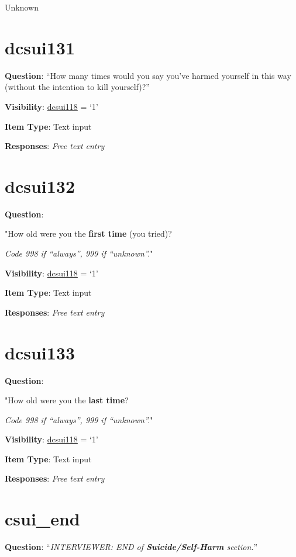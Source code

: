 \documentclass[]{book}
\begin{document}
Unknown

\hypertarget{dcsui131}{%
\section{dcsui131}\label{dcsui131}}

\textbf{Question}: ``How many times would you say you've harmed yourself in this way (without the intention to kill yourself)?''

\textbf{Visibility}: \protect\hyperlink{dcsui118}{dcsui118} = `1'

\textbf{Item Type}: Text input

\textbf{Responses}: \emph{Free text entry}

\hypertarget{dcsui132}{%
\section{dcsui132}\label{dcsui132}}

\textbf{Question}:

"How old were you the \textbf{first time} (you tried)?

\emph{Code 998 if ``always'', 999 if ``unknown''.}"

\textbf{Visibility}: \protect\hyperlink{dcsui118}{dcsui118} = `1'

\textbf{Item Type}: Text input

\textbf{Responses}: \emph{Free text entry}

\hypertarget{dcsui133}{%
\section{dcsui133}\label{dcsui133}}

\textbf{Question}:

"How old were you the \textbf{last time}?

\emph{Code 998 if ``always'', 999 if ``unknown''.}"

\textbf{Visibility}: \protect\hyperlink{dcsui118}{dcsui118} = `1'

\textbf{Item Type}: Text input

\textbf{Responses}: \emph{Free text entry}

\hypertarget{csui_end}{%
\section{csui\_end}\label{csui_end}}

\textbf{Question}: ``\emph{INTERVIEWER: END of \textbf{Suicide/Self-Harm} section.}''
\end{document}

